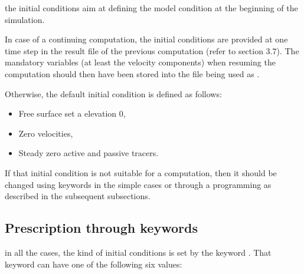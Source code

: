 the initial conditions aim at defining the model condition at the beginning of
the simulation.

In case of a continuing computation, the initial conditions are provided at one
time step in the result file of the previous computation (refer to section
3.7). The mandatory variables (at least the velocity components) when resuming
the computation should then have been stored into the file being used as
.

Otherwise, the default initial condition is defined as follows:

\begin{itemize}
\item Free surface set a elevation 0,

\item Zero velocities,

\item Steady zero active and passive tracers.
\end{itemize}

If that initial condition is not suitable for a computation, then it should be
changed using keywords in the simple cases or through a programming as
described in the subsequent subsections.


\subsection{Prescription through keywords}

in all the cases, the kind of initial conditions is set by the keyword
. That keyword can have one of the following six
values:

